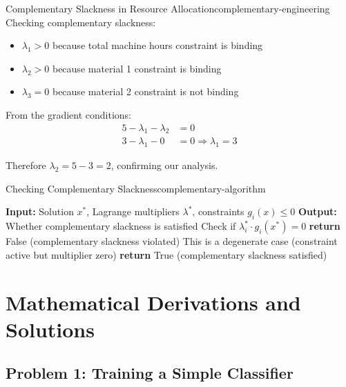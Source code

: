 \documentclass[12pt]{article}
\begin{document}
\begin{example}{Complementary Slackness in Resource Allocation}{complementary-engineering}
Checking complementary slackness:
\begin{itemize}
    \item $\lambda_1 > 0$ because total machine hours constraint is binding
    \item $\lambda_2 > 0$ because material 1 constraint is binding
    \item $\lambda_3 = 0$ because material 2 constraint is not binding
\end{itemize}

From the gradient conditions:
\begin{align}
5 - \lambda_1 - \lambda_2 &= 0 \\
3 - \lambda_1 - 0 &= 0 \Rightarrow \lambda_1 = 3
\end{align}

Therefore $\lambda_2 = 5 - 3 = 2$, confirming our analysis.
\end{example}

\begin{algorithmenv}{Checking Complementary Slackness}{complementary-algorithm}
\begin{algorithmic}[1]
\State \textbf{Input:} Solution $x^*$, Lagrange multipliers $\lambda^*$, constraints $g_i(x) \leq 0$
\State \textbf{Output:} Whether complementary slackness is satisfied
    \State Check if $\lambda_i^* \cdot g_i(x^*) = 0$
        \State \textbf{return} False (complementary slackness violated)
    \EndIf
        \State This is a degenerate case (constraint active but multiplier zero)
    \EndIf
\EndFor
\State \textbf{return} True (complementary slackness satisfied)
\end{algorithmic}
\end{algorithmenv}




\section{Mathematical Derivations and Solutions}

\subsection{Problem 1: Training a Simple Classifier}
\end{document}
